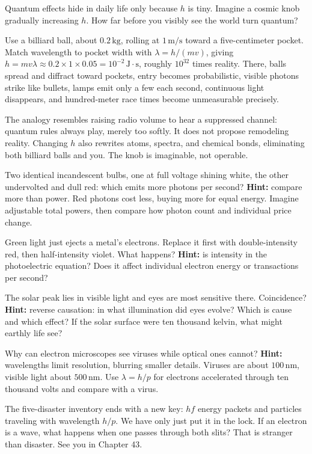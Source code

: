 \begin{thought}
Quantum effects hide in daily life only because \(h\) is tiny. Imagine a cosmic knob gradually increasing \(h\). How far before you visibly see the world turn quantum?

Use a billiard ball, about \(0.2\,\mathrm{kg}\), rolling at \(1\,\mathrm{m/s}\) toward a five-centimeter pocket. Match wavelength to pocket width with \(\lambda = h/(mv)\), giving \(h = mv\lambda \approx 0.2\times1\times0.05 = 10^{-2}\,\mathrm{J\cdot s}\), roughly \(10^{32}\) times reality. There, balls spread and diffract toward pockets, entry becomes probabilistic, visible photons strike like bullets, lamps emit only a few each second, continuous light disappears, and hundred-meter race times become unmeasurable precisely.

The analogy resembles raising radio volume to hear a suppressed channel: quantum rules always play, merely too softly. It does not propose remodeling reality. Changing \(h\) also rewrites atoms, spectra, and chemical bonds, eliminating both billiard balls and you. The knob is imaginable, not operable.
\end{thought}

\begin{puzzles}
\item Two identical incandescent bulbs, one at full voltage shining white, the other undervolted and dull red: which emits more photons per second? \textbf{Hint:} compare more than power. Red photons cost less, buying more for equal energy. Imagine adjustable total powers, then compare how photon count and individual price change.
\item Green light just ejects a metal's electrons. Replace it first with double-intensity red, then half-intensity violet. What happens? \textbf{Hint:} is intensity in the photoelectric equation? Does it affect individual electron energy or transactions per second?
\item The solar peak lies in visible light and eyes are most sensitive there. Coincidence? \textbf{Hint:} reverse causation: in what illumination did eyes evolve? Which is cause and which effect? If the solar surface were ten thousand kelvin, what might earthly life see?
\item Why can electron microscopes see viruses while optical ones cannot? \textbf{Hint:} wavelengths limit resolution, blurring smaller details. Viruses are about \(100\,\mathrm{nm}\), visible light about \(500\,\mathrm{nm}\). Use \(\lambda = h/p\) for electrons accelerated through ten thousand volts and compare with a virus.
\end{puzzles}

The five-disaster inventory ends with a new key: \(hf\) energy packets and particles traveling with wavelength \(h/p\). We have only just put it in the lock. If an electron is a wave, what happens when one passes through both slits? That is stranger than disaster. See you in Chapter 43.
